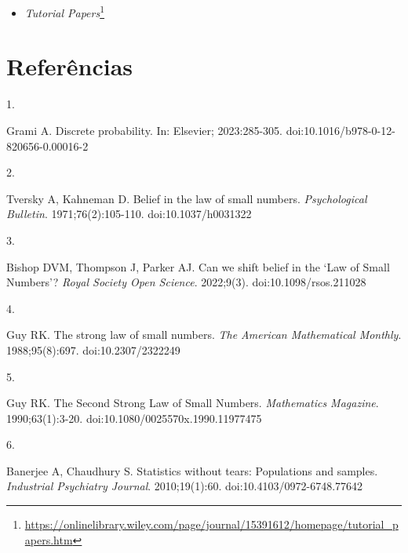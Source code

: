 \documentclass[
  a4paper,
]{book}
\providecommand{\tightlist}{%
  \setlength{\itemsep}{0pt}\setlength{\parskip}{0pt}}
\newlength{\cslhangindent}
\newlength{\csllabelwidth}
\newlength{\cslentryspacingunit} %
\newenvironment{CSLReferences}[2] %
 {%
  \setlength{\parindent}{0pt}
  \ifodd #1
  \let\oldpar\par
  \def\par{\hangindent=\cslhangindent\oldpar}
  \fi
  \setlength{\parskip}{#2\cslentryspacingunit}
 }%
 {}
\newcommand{\CSLLeftMargin}[1]{\parbox[t]{\csllabelwidth}{#1}}
\newcommand{\CSLRightInline}[1]{\parbox[t]{\linewidth - \csllabelwidth}{#1}\break}
\renewcommand{\href}[2]{#2\footnote{\url{#1}}}
\newcommand{\DisableFootNotes}{%
  \renewcommand{\footnote}[2][]{\relax}
}
\begin{document}
\begin{itemize}
\tightlist
\item
  \href{https://onlinelibrary.wiley.com/page/journal/15391612/homepage/tutorial_papers.htm}{\emph{Tutorial Papers}}
\end{itemize}

\hypertarget{referuxeancias}{%
\chapter*{\texorpdfstring{\textbf{Referências}}{Referências}}\label{referuxeancias}}

\DisableFootNotes

\hypertarget{refs}{}
\begin{CSLReferences}{0}{0}
\leavevmode{}%
\CSLLeftMargin{1. }%
\CSLRightInline{Grami A. Discrete probability. In: Elsevier; 2023:285-305. doi:\href{https://doi.org/10.1016/b978-0-12-820656-0.00016-2}{10.1016/b978-0-12-820656-0.00016-2}}

\leavevmode{}%
\CSLLeftMargin{2. }%
\CSLRightInline{Tversky A, Kahneman D. Belief in the law of small numbers. \emph{Psychological Bulletin}. 1971;76(2):105-110. doi:\href{https://doi.org/10.1037/h0031322}{10.1037/h0031322}}

\leavevmode{}%
\CSLLeftMargin{3. }%
\CSLRightInline{Bishop DVM, Thompson J, Parker AJ. Can we shift belief in the {`}Law of Small Numbers{'}? \emph{Royal Society Open Science}. 2022;9(3). doi:\href{https://doi.org/10.1098/rsos.211028}{10.1098/rsos.211028}}

\leavevmode{}%
\CSLLeftMargin{4. }%
\CSLRightInline{Guy RK. The strong law of small numbers. \emph{The American Mathematical Monthly}. 1988;95(8):697. doi:\href{https://doi.org/10.2307/2322249}{10.2307/2322249}}

\leavevmode{}%
\CSLLeftMargin{5. }%
\CSLRightInline{Guy RK. The Second Strong Law of Small Numbers. \emph{Mathematics Magazine}. 1990;63(1):3-20. doi:\href{https://doi.org/10.1080/0025570x.1990.11977475}{10.1080/0025570x.1990.11977475}}

\leavevmode{}%
\CSLLeftMargin{6. }%
\CSLRightInline{Banerjee A, Chaudhury S. Statistics without tears: Populations and samples. \emph{Industrial Psychiatry Journal}. 2010;19(1):60. doi:\href{https://doi.org/10.4103/0972-6748.77642}{10.4103/0972-6748.77642}}


\end{CSLReferences}
\end{document}
